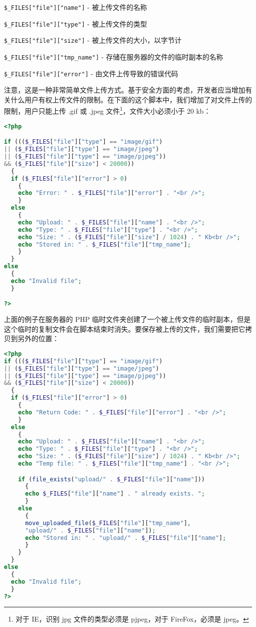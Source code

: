 \begin{compactitem}
\item \texttt{\$\_FILES["file"]["name"]} - 被上传文件的名称
\item \texttt{\$\_FILES["file"]["type"]} - 被上传文件的类型
\item \texttt{\$\_FILES["file"]["size"]} - 被上传文件的大小，以字节计
\item \texttt{\$\_FILES["file"]["tmp\_name"]} - 存储在服务器的文件的临时副本的名称
\item \texttt{\$\_FILES["file"]["error"]} - 由文件上传导致的错误代码
\end{compactitem}

注意，这是一种非常简单文件上传方式。基于安全方面的考虑，开发者应当增加有关什么用户有权上传文件的限制。在下面的这个脚本中，我们增加了对文件上传的限制，用户只能上传 .gif 或 .jpeg 文件\footnote{对于 IE，识别 jpg 文件的类型必须是 pjpeg，对于 FireFox，必须是 jpeg。}，文件大小必须小于 20 kb：

\begin{lstlisting}[language=PHP]
<?php

if ((($_FILES["file"]["type"] == "image/gif")
|| ($_FILES["file"]["type"] == "image/jpeg")
|| ($_FILES["file"]["type"] == "image/pjpeg"))
&& ($_FILES["file"]["size"] < 20000))
  {
  if ($_FILES["file"]["error"] > 0)
    {
    echo "Error: " . $_FILES["file"]["error"] . "<br />";
    }
  else
    {
    echo "Upload: " . $_FILES["file"]["name"] . "<br />";
    echo "Type: " . $_FILES["file"]["type"] . "<br />";
    echo "Size: " . ($_FILES["file"]["size"] / 1024) . " Kb<br />";
    echo "Stored in: " . $_FILES["file"]["tmp_name"];
    }
  }
else
  {
  echo "Invalid file";
  }

?>
\end{lstlisting}

上面的例子在服务器的 PHP 临时文件夹创建了一个被上传文件的临时副本，但是这个临时的复制文件会在脚本结束时消失。要保存被上传的文件，我们需要把它拷贝到另外的位置：

\begin{lstlisting}[language=PHP]
<?php
if ((($_FILES["file"]["type"] == "image/gif")
|| ($_FILES["file"]["type"] == "image/jpeg")
|| ($_FILES["file"]["type"] == "image/pjpeg"))
&& ($_FILES["file"]["size"] < 20000))
  {
  if ($_FILES["file"]["error"] > 0)
    {
    echo "Return Code: " . $_FILES["file"]["error"] . "<br />";
    }
  else
    {
    echo "Upload: " . $_FILES["file"]["name"] . "<br />";
    echo "Type: " . $_FILES["file"]["type"] . "<br />";
    echo "Size: " . ($_FILES["file"]["size"] / 1024) . " Kb<br />";
    echo "Temp file: " . $_FILES["file"]["tmp_name"] . "<br />";

    if (file_exists("upload/" . $_FILES["file"]["name"]))
      {
      echo $_FILES["file"]["name"] . " already exists. ";
      }
    else
      {
      move_uploaded_file($_FILES["file"]["tmp_name"],
      "upload/" . $_FILES["file"]["name"]);
      echo "Stored in: " . "upload/" . $_FILES["file"]["name"];
      }
    }
  }
else
  {
  echo "Invalid file";
  }
?>
\end{lstlisting}

